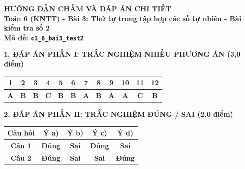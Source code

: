 \documentclass[11pt,a4paper]{article}
\begin{document}
\newpage
\begin{center}
{\Large\bfseries HƯỚNG DẪN CHẤM VÀ ĐÁP ÁN CHI TIẾT}\\[4pt]
{\large\bfseries Toán 6 (KNTT) - Bài 3: Thứ tự trong tập hợp các số tự nhiên - Bài kiểm tra số 2}\\[2pt]
{\bfseries Mã đề: \texttt{c1\_6\_bai3\_test2}}
\end{center}

\vspace{10pt}
\noindent\textbf{\large 1. ĐÁP ÁN PHẦN I: TRẮC NGHIỆM NHIỀU PHƯƠNG ÁN (3,0 điểm)}
\vspace{4pt}
\begin{center}
\begin{tabular}{|c|c|c|c|c|c|c|c|c|c|c|c|}
\hline
\textbf{1} & \textbf{2} & \textbf{3} & \textbf{4} & \textbf{5} & \textbf{6} & \textbf{7} & \textbf{8} & \textbf{9} & \textbf{10} & \textbf{11} & \textbf{12} \\
\hline
\textbf{A} & \textbf{B} & \textbf{B} & \textbf{C} & \textbf{B} & \textbf{B} & \textbf{A} & \textbf{B} & \textbf{A} & \textbf{A} & \textbf{C} & \textbf{B} \\
\hline
\end{tabular}
\end{center}
\vspace{6pt}


\noindent\textbf{\large 2. ĐÁP ÁN PHẦN II: TRẮC NGHIỆM ĐÚNG / SAI (2,0 điểm)}
\vspace{4pt}
\begin{center}
\begin{tabular}{|c|c|c|c|c|}
\hline
\textbf{Câu hỏi} & \textbf{Ý a)} & \textbf{Ý b)} & \textbf{Ý c)} & \textbf{Ý d)} \\
\hline
\textbf{Câu 1} & \textbf{Đúng} & \textbf{Sai} & \textbf{Đúng} & \textbf{Sai} \\
\hline
\textbf{Câu 2} & \textbf{Đúng} & \textbf{Sai} & \textbf{Sai} & \textbf{Đúng} \\
\hline
\end{tabular}
\end{center}
\vspace{6pt}
\end{document}
